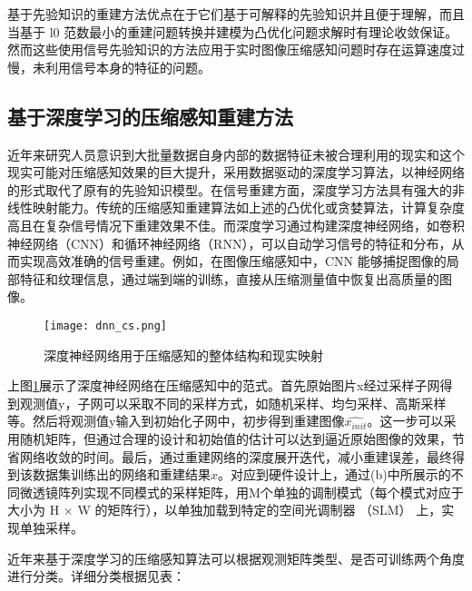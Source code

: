 基于先验知识的重建方法优点在于它们基于可解释的先验知识并且便于理解，而且当基于 l0 范数最小的重建问题转换并建模为凸优化问题求解时有理论收敛保证。然而这些使用信号先验知识的方法应用于实时图像压缩感知问题时存在运算速度过慢，未利用信号本身的特征的问题。

\subsection{基于深度学习的压缩感知重建方法}
近年来研究人员意识到大批量数据自身内部的数据特征未被合理利用的现实和这个现实可能对压缩感知效果的巨大提升，采用数据驱动的深度学习算法，以神经网络的形式取代了原有的先验知识模型。在信号重建方面，深度学习方法具有强大的非线性映射能力。传统的压缩感知重建算法如上述的凸优化或贪婪算法，计算复杂度高且在复杂信号情况下重建效果不佳。而深度学习通过构建深度神经网络，如卷积神经网络（CNN）和循环神经网络（RNN），可以自动学习信号的特征和分布，从而实现高效准确的信号重建。例如，在图像压缩感知中，CNN 能够捕捉图像的局部特征和纹理信息，通过端到端的训练，直接从压缩测量值中恢复出高质量的图像。

\begin{figure}[ht]
  \centering
  \texttt{[image: dnn\_cs.png]}
  \caption{深度神经网络用于压缩感知的整体结构和现实映射\cite{Practical_compact_deep_compressed_sensing}}
  \label{fig:dnn_cs}
\end{figure}

上图\ref{fig:dnn_cs}展示了深度神经网络在压缩感知中的范式。首先原始图片x经过采样子网得到观测值y，子网可以采取不同的采样方式，如随机采样、均匀采样、高斯采样等。然后将观测值y输入到初始化子网中，初步得到重建图像$\hat{x_{init}}$。这一步可以采用随机矩阵，但通过合理的设计和初始值的估计可以达到逼近原始图像的效果，节省网络收敛的时间。最后，通过重建网络的深度展开迭代，减小重建误差，最终得到该数据集训练出的网络和重建结果$\hat{x}$。对应到硬件设计上，通过(b)中所展示的不同微透镜阵列实现不同模式的采样矩阵，用M个单独的调制模式（每个模式对应于大小为 H × W 的矩阵行），以单独加载到特定的空间光调制器 （SLM） 上，实现单独采样。

近年来基于深度学习的压缩感知算法可以根据观测矩阵类型、是否可训练两个角度进行分类。详细分类根据\cite{Practical_compact_deep_compressed_sensing}见表：


